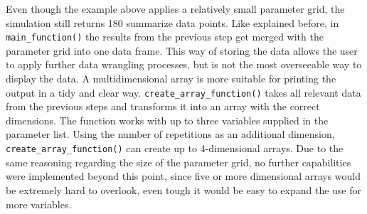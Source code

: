\documentclass[11pt,a4paper]{article}
\begin{document}
Even though the example above applies a relatively small parameter grid,
the simulation still returns 180 summarize data points. Like explained
before, in \texttt{main\_function()} the results from the previous step
get merged with the parameter grid into one data frame. This way of
storing the data allows the user to apply further data wrangling
processes, but is not the most overseeable way to display the data. A
multidimensional array is more suitable for printing the output in a
tidy and clear way. \texttt{create\_array\_function()} takes all
relevant data from the previous steps and transforms it into an array
with the correct dimensions. The function works with up to three
variables supplied in the parameter list. Using the number of
repetitions as an additional dimension,
\texttt{create\_array\_function()} can create up to 4-dimensional
arrays. Due to the same reasoning regarding the size of the parameter
grid, no further capabilities were implemented beyond this point, since
five or more dimensional arrays would be extremely hard to overlook,
even tough it would be easy to expand the use for more variables.
\end{document}
